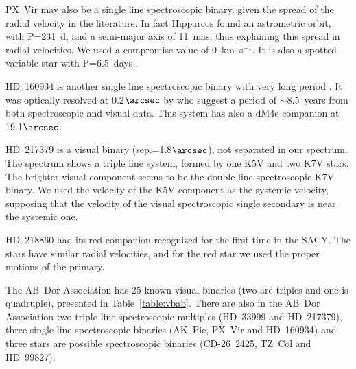 \documentclass[11pt,twoside]{book}
\begin{document}
PX~Vir may also be a single line spectroscopic binary, given the
spread of the radial velocity in the literature.  In fact Hipparcos
found an astrometric orbit, with P=231~d, and a semi-major axis of
11~mas, thus explaining this spread in radial velocities.  We used a
compromise value of 0~km~s$^{-1}$.  It is also a spotted variable star
with P=6.5~days \citep{gaidos00, strass00}.

HD~160934 is another single line spectroscopic binary with very long
period \citep{galvez06}.  It was optically resolved at 0.2$\arcsec$ by
\citet{hormuth07} who suggest a period of $\sim$8.5~years from both
spectroscopic and visual data.  This system has also a dM4e companion
at 19.1$\arcsec$.

HD~217379 is a visual binary (sep.=1.8$\arcsec$), not separated in our spectrum.
The spectrum shows a triple line system, formed by one K5V and two K7V stars.
The brighter visual component seems to be the double line spectroscopic K7V binary.
We used the velocity of the K5V component as the systemic velocity, supposing
that the velocity of the visual spectroscopic single secondary is near the systemic one.


HD~218860 had its red companion recognized for the first time in the
SACY.  The stars have similar radial velocities, and for the
red star we used the proper motions of the primary.

The  AB~Dor Association has 25 known visual binaries (two are triples and one is quadruple),
presented in Table~\ref{table:vbab}.
There are also in the AB~Dor Association two triple line spectroscopic multiples
(HD~33999  and HD~217379),
three single line spectroscopic binaries (AK~Pic, PX~Vir and HD~160934) and
three stars  are possible spectroscopic binaries (CD-26~2425, TZ~Col and HD~99827).
\end{document}

